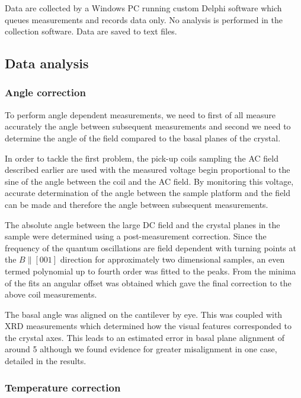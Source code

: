 Data are collected by a Windows PC running custom Delphi software which queues measurements and records data only. No analysis is performed in the collection software. Data are saved to text files.

\subsection{Data analysis}

\subsubsection{Angle correction}
    \label{Sec:Exp:AngleCorrection}

To perform angle dependent measurements, we need to first of all measure accurately the angle between subsequent measurements and second we need to determine the angle of the field compared to the basal planes of the crystal. 

In order to tackle the first problem, the pick-up coils sampling the AC field described earlier are used with the measured voltage begin proportional to the sine of the angle between the coil and the AC field. By monitoring this voltage, accurate determination of the angle between the sample platform and the field can be made and therefore the angle between subsequent measurements.

The absolute angle between the large DC field and the crystal planes in the sample were determined using a post-measurement correction. Since the frequency of the quantum oscillations are field dependent with turning points at the $B\parallel [001]$ direction for approximately two dimensional samples, an even termed polynomial up to fourth order was fitted to the peaks. From the minima of the fits an angular offset was obtained which gave the final correction to the above coil measurements.

The basal angle was aligned on the cantilever by eye. This was coupled with \ac{XRD} measurements which determined how the visual features corresponded to the crystal axes. This leads to an estimated error in basal plane alignment of around \unit{5}{\degree} although we found evidence for greater misalignment in one case, detailed in the results.

\subsubsection{Temperature correction}
    \label{Sec:Exp:TemperatureCorrection}

